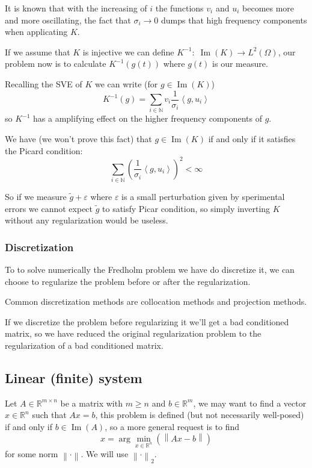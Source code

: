 \documentclass[a4paper,10pt]{article}
\theoremstyle{plain}
\theoremstyle{definition}
\theoremstyle{remark}
\newcommand{\pa}[1]{\left(#1\right)}
\newcommand{\ang}[1]{\left<#1\right>}
\newcommand{\norm}[1]{\left\|#1\right\|}
\DeclareMathOperator{\im}{Im}
\begin{document}
It is known that with the increasing of $i$ the functions $v_i$ and
$u_i$ becomes more and more oscillating, the fact that $\sigma _i \to
0$ dumps that high frequency components when applicating $K$.


If we assume that $K$ is injective we can define $K^{-1}:\; \im(K) \to
L^2(\Omega)$, our problem now is to calculate $K^{-1}(g(t))$ where
$g(t)$ is our measure.

Recalling the SVE of $K$ we can write (for $g\in \im(K)$)
\begin{equation}
  \label{eq:inverseSVE}
  K^{-1}(g) = \sum _{i\in \mathbb{N}} v_i \frac{1}{\sigma _i} \ang{g,u_i}
\end{equation}
so $K^{-1}$ has a amplifying effect on the higher frequency components
of $g$.

We have (we won't prove this fact) that $g\in \im (K)$ if and only if
it satisfies the Picard condition:
\[ \sum _{i\in \mathbb{N}} \pa{ \frac{1}{\sigma _i} \ang{g,u_i}} ^2 <
\infty \] 

So if we measure $\tilde g + \varepsilon$ where $\varepsilon$ is a
small perturbation given by sperimental errors we cannot expect
$\tilde g$ to satisfy Picar condition, so simply inverting $K$ without
any regularization would be useless.


\subsubsection{Discretization}
\label{sec:fredholmdiscretization}

To to solve numerically the Fredholm problem we have do discretize it,
we can choose to regularize the problem before or after the
regularization.

Common discretization methods are collocation methods and projection
methods.

If we discretize the problem before regularizing it we'll get a bad
conditioned matrix, so we have reduced the original regularization
problem to the regularization of a bad conditioned matrix.

\subsection{Linear (finite) system}
\label{sec:exmatrix}

Let $A\in \mathbb{R}^{m \times n}$ be a matrix with $m \ge n$ and $b
\in \mathbb{R}^m$, we may want to find a vector $x \in \mathbb{R}^n$
such that $Ax = b$, this problem is defined (but not necessarily
well-posed) if and only if $b\in \im (A)$, so a more general request
is to find
\begin{equation}
  \label{eq:minxunreg}
  x = \arg\min _{x\in \mathbb{R}^n} \pa{ \norm{Ax -b} }
\end{equation}
for some norm $\norm{\cdot}$. We will use $\norm{\cdot}_2$.
\end{document}
